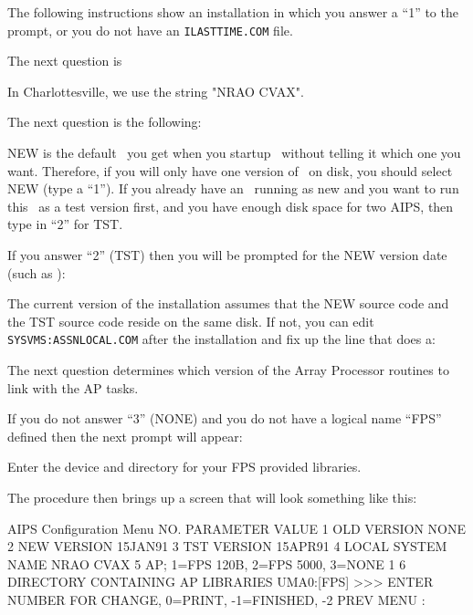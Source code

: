 The following instructions show an installation in which you answer a
``1'' to the prompt, or you do not have an {\tt ILASTTIME.COM} file.
\medskip

The next question is\medskip

\medskip

\noindent
In Charlottesville, we use the string "NRAO CVAX".

The next question is the following:\medskip

\medskip

\noindent
NEW is the default \aips\ you get when you startup \aips\ without telling
it which one you want.  Therefore, if you will only have one version
of \aips\ on disk, you should select NEW (type a ``1'').  If you already
have an \aips\ running as new and you want to run this \aips\ as a test
version first, and you have enough disk space for two AIPS, then type
in ``2'' for TST.

If you answer ``2'' (TST) then you will be prompted for the NEW version
date (such as \OLDVER):\medskip

\medskip

The current version of the installation assumes that the NEW source
code and the TST source code reside on the same disk.  If not, you
can edit {\tt SYSVMS:ASSNLOCAL.COM} after the installation and fix up the
line that does a:\medskip

\medskip

The next question determines which version of the Array Processor
routines to link with the AP tasks.\medskip

\medskip

\noindent
If you do not answer ``3'' (NONE) and you do not have a logical name
``FPS'' defined then the next prompt will appear:\medskip


\noindent
Enter the device and directory for your FPS provided libraries.

The procedure then brings up a screen that will look something like
this:\medskip

\fortran
AIPS Configuration Menu
NO.  PARAMETER                                 VALUE
1   OLD VERSION                                NONE
2   NEW VERSION                                15JAN91
3   TST VERSION                                15APR91
4   LOCAL SYSTEM NAME                          NRAO CVAX
5   AP; 1=FPS 120B, 2=FPS 5000, 3=NONE         1
6   DIRECTORY CONTAINING AP LIBRARIES          UMA0:[FPS]
>>> ENTER NUMBER FOR CHANGE, 0=PRINT, -1=FINISHED, -2 PREV MENU :
\endfortran\medskip

